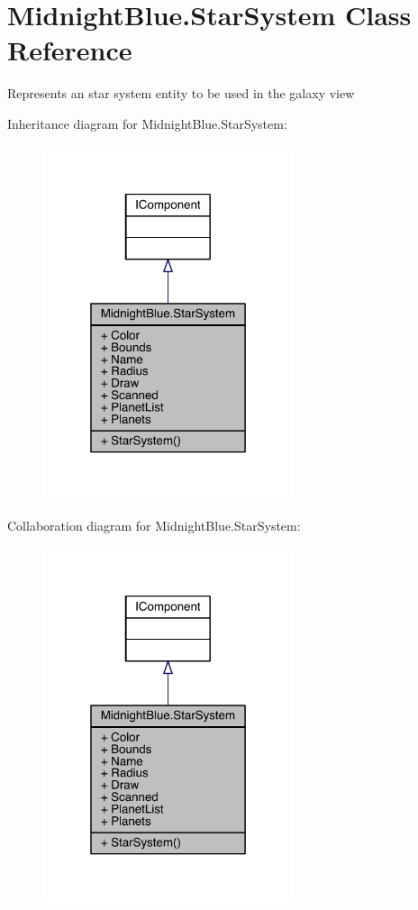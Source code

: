 \hypertarget{class_midnight_blue_1_1_star_system}{}\section{Midnight\+Blue.\+Star\+System Class Reference}
\label{class_midnight_blue_1_1_star_system}


Represents an star system entity to be used in the galaxy view  




Inheritance diagram for Midnight\+Blue.\+Star\+System\+:\nopagebreak
\begin{figure}[H]
\begin{center}
\leavevmode
\includegraphics[width=208pt]{class_midnight_blue_1_1_star_system__inherit__graph}
\end{center}
\end{figure}


Collaboration diagram for Midnight\+Blue.\+Star\+System\+:\nopagebreak
\begin{figure}[H]
\begin{center}
\leavevmode
\includegraphics[width=208pt]{class_midnight_blue_1_1_star_system__coll__graph}
\end{center}
\end{figure}
